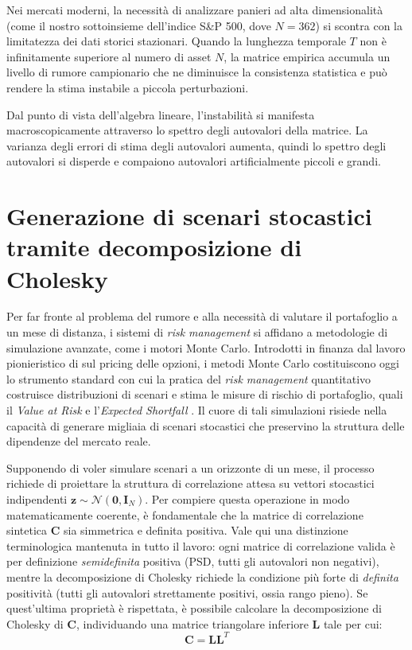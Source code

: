 Nei mercati moderni, la necessità di analizzare panieri ad alta dimensionalità (come il nostro sottoinsieme dell'indice S\&P 500, dove $N = 362$) si scontra con la limitatezza dei dati storici stazionari. Quando la lunghezza temporale $T$ non è infinitamente superiore al numero di asset $N$, la matrice empirica accumula un livello di rumore campionario che ne diminuisce la consistenza statistica e può rendere la stima instabile a piccola perturbazioni.

Dal punto di vista dell'algebra lineare, l'instabilità si manifesta macroscopicamente attraverso lo spettro degli autovalori della matrice. La varianza degli errori di stima degli autovalori aumenta, quindi lo spettro degli autovalori si disperde e compaiono autovalori artificialmente piccoli e grandi.

\section{Generazione di scenari stocastici tramite decomposizione di Cholesky}
\label{sec:scenari_stocastici}

Per far fronte al problema del rumore e alla necessità di valutare il portafoglio a un mese di distanza, i sistemi di \emph{risk management} si affidano a metodologie di simulazione avanzate, come i motori Monte Carlo. Introdotti in finanza dal lavoro pionieristico di \citet{boyle1977options} sul pricing delle opzioni, i metodi Monte Carlo costituiscono oggi lo strumento standard con cui la pratica del \emph{risk management} quantitativo costruisce distribuzioni di scenari e stima le misure di rischio di portafoglio, quali il \emph{Value at Risk} e l'\emph{Expected Shortfall} \citep{glasserman2003montecarlo, jorion2007var, mcneil2015qrm}. Il cuore di tali simulazioni risiede nella capacità di generare migliaia di scenari stocastici che preservino la struttura delle dipendenze del mercato reale.

Supponendo di voler simulare scenari a un orizzonte di un mese, il processo richiede di proiettare la struttura di correlazione attesa su vettori stocastici indipendenti $\mathbf{z} \sim \mathcal{N}(\mathbf{0}, \mathbf{I}_N)$. Per compiere questa operazione in modo matematicamente coerente, è fondamentale che la matrice di correlazione sintetica $\mathbf{C}$ sia simmetrica e definita positiva. Vale qui una distinzione terminologica mantenuta in tutto il lavoro: ogni matrice di correlazione valida è per definizione \emph{semidefinita} positiva (PSD, tutti gli autovalori non negativi), mentre la decomposizione di Cholesky richiede la condizione più forte di \emph{definita} positività (tutti gli autovalori strettamente positivi, ossia rango pieno). Se quest'ultima proprietà è rispettata, è possibile calcolare la decomposizione di Cholesky di $\mathbf{C}$, individuando una matrice triangolare inferiore $\mathbf{L}$ tale per cui:
\begin{equation}
\mathbf{C} = \mathbf{L} \mathbf{L}^T
\end{equation}

